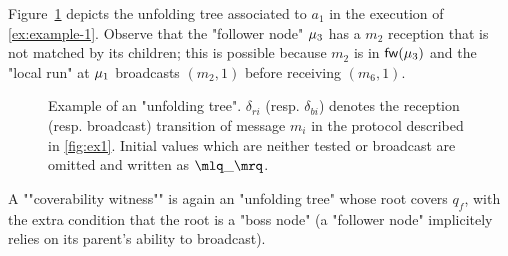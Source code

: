 \begin{example}
	Figure~\ref{fig:ex-unfolding-tree} depicts the unfolding tree associated to $a_1$ in the execution of \cref{ex:example-1}. 
	Observe that the "follower node" $\mu_3$ has a $m_2$ reception that is not matched by its children; this is possible because $m_2$ is in $\mathsf{fw}(\mu_3)$ and the "local run" at $\mu_1$ broadcasts $(m_2,1)$ before receiving $(m_6,1)$.  
\end{example}
\begin{figure}[t]
	\begin{center}
					
		\end{center}
	\vspace*{-0.5cm}
	\caption{Example of an "unfolding tree". $\delta_{ri}$ (resp. $\delta_{bi}$) denotes the reception (resp. broadcast) transition of message $m_i$ in the protocol described in \cref{fig:ex1}. Initial values which are neither tested or broadcast are omitted and written as $\quotemarks{\_}$.}\label{fig:ex-unfolding-tree}
\end{figure}

A ""coverability witness"" is again an "unfolding tree" whose root covers $q_f$, with the extra condition that the root is a "boss node" (a "follower node" implicitely relies on its parent's ability to broadcast). 

